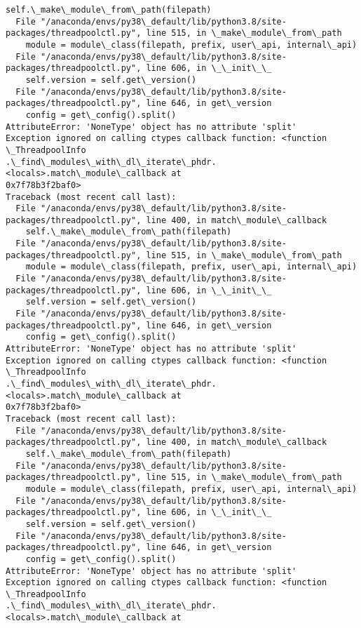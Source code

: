 \documentclass[11pt]{article}
\begin{document}
\begin{Verbatim}[commandchars=\\\{\}]
    self.\_make\_module\_from\_path(filepath)
  File "/anaconda/envs/py38\_default/lib/python3.8/site-
packages/threadpoolctl.py", line 515, in \_make\_module\_from\_path
    module = module\_class(filepath, prefix, user\_api, internal\_api)
  File "/anaconda/envs/py38\_default/lib/python3.8/site-
packages/threadpoolctl.py", line 606, in \_\_init\_\_
    self.version = self.get\_version()
  File "/anaconda/envs/py38\_default/lib/python3.8/site-
packages/threadpoolctl.py", line 646, in get\_version
    config = get\_config().split()
AttributeError: 'NoneType' object has no attribute 'split'
Exception ignored on calling ctypes callback function: <function \_ThreadpoolInfo
.\_find\_modules\_with\_dl\_iterate\_phdr.<locals>.match\_module\_callback at
0x7f78b3f2baf0>
Traceback (most recent call last):
  File "/anaconda/envs/py38\_default/lib/python3.8/site-
packages/threadpoolctl.py", line 400, in match\_module\_callback
    self.\_make\_module\_from\_path(filepath)
  File "/anaconda/envs/py38\_default/lib/python3.8/site-
packages/threadpoolctl.py", line 515, in \_make\_module\_from\_path
    module = module\_class(filepath, prefix, user\_api, internal\_api)
  File "/anaconda/envs/py38\_default/lib/python3.8/site-
packages/threadpoolctl.py", line 606, in \_\_init\_\_
    self.version = self.get\_version()
  File "/anaconda/envs/py38\_default/lib/python3.8/site-
packages/threadpoolctl.py", line 646, in get\_version
    config = get\_config().split()
AttributeError: 'NoneType' object has no attribute 'split'
Exception ignored on calling ctypes callback function: <function \_ThreadpoolInfo
.\_find\_modules\_with\_dl\_iterate\_phdr.<locals>.match\_module\_callback at
0x7f78b3f2baf0>
Traceback (most recent call last):
  File "/anaconda/envs/py38\_default/lib/python3.8/site-
packages/threadpoolctl.py", line 400, in match\_module\_callback
    self.\_make\_module\_from\_path(filepath)
  File "/anaconda/envs/py38\_default/lib/python3.8/site-
packages/threadpoolctl.py", line 515, in \_make\_module\_from\_path
    module = module\_class(filepath, prefix, user\_api, internal\_api)
  File "/anaconda/envs/py38\_default/lib/python3.8/site-
packages/threadpoolctl.py", line 606, in \_\_init\_\_
    self.version = self.get\_version()
  File "/anaconda/envs/py38\_default/lib/python3.8/site-
packages/threadpoolctl.py", line 646, in get\_version
    config = get\_config().split()
AttributeError: 'NoneType' object has no attribute 'split'
Exception ignored on calling ctypes callback function: <function \_ThreadpoolInfo
.\_find\_modules\_with\_dl\_iterate\_phdr.<locals>.match\_module\_callback at

\end{Verbatim}
\end{document}
